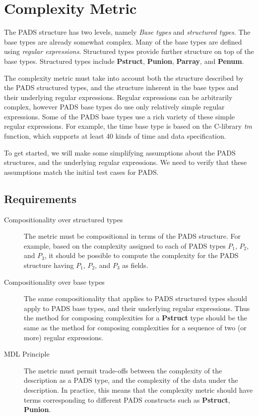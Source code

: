 \section{Complexity Metric}
\label{sec:ComplexityMetric}

The PADS structure has two levels, namely \textit{Base types} and
\textit{structured types}. The base types are already somewhat complex.
Many of the base types are defined using \textit{regular expressions}.
Structured types provide further structure on top of the base types.
Structured types include \textbf{Pstruct}, \textbf{Punion},
\textbf{Parray}, and \textbf{Penum}.

The complexity metric must take into account both the structure
described by the PADS structured types, and the structure inherent in
the base types and their underlying regular expressions. Regular
expressions can be arbitrarily complex, however PADS base types do use
only relatively simple regular expressions. Some of the PADS base
types use a rich variety of these simple regular expressions. For
example, the time base type is based on the C-library \textit{tm}
function, which supports at least 40 kinds of time and data
specification.

To get started, we will make some simplifying assumptions about the
PADS structures, and the underlying regular expressions. We need to
verify that these assumptions match the initial test cases for PADS.

\subsection{Requirements}

\begin{description}

\item [Compositionality over structured types]
The metric must be compositional in terms of the PADS structure.
For example, based on the complexity assigned to each of PADS
types $P_1$, $P_2$, and $P_3$, it should be possible to compute
the complexity for the PADS structure having $P_1$, $P_2$, and $P_3$
as fields.

\item [Compositionality over base types]
The same compositionality that applies to PADS structured types should
apply to PADS base types, and their underlying regular
expressions. Thus the method for composing complexities for a
\textbf{Pstruct} type should be the same as the method for composing
complexities for a sequence of two (or more) regular expressions.

\item [MDL Principle]
The metric must permit trade-offs between the complexity of the
description as a PADS type, and the complexity of the data under
the description. In practice, this means that the complexity metric
should have terms corresponding to different PADS constructs such
as \textbf{Pstruct}, \textbf{Punion}.

\end{description}

